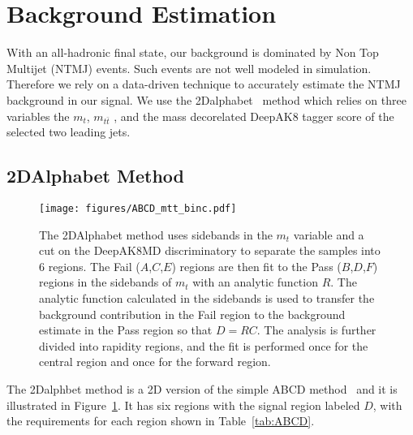 \section{Background Estimation}
\label{sec:bkg_est}

With an all-hadronic final state, our background is dominated by Non Top Multijet (NTMJ) events. Such events are not well modeled in simulation. Therefore we rely on a data-driven technique to accurately estimate the NTMJ background in our signal. We use the 2Dalphabet~\cite{2DAlphabet} method which relies on three variables the $m_{t}$, $m_{t\bar{t}}$ , and the mass decorelated DeepAK8 tagger score of the selected two leading jets.






\subsection{2DAlphabet Method}


\begin{figure}[h!]
	\begin{center}
		\texttt{[image: figures/ABCD\_mtt\_binc.pdf]}
		\caption{The 2DAlphabet method uses sidebands in the $m_{t}$ variable and a cut on the DeepAK8MD discriminatory to separate the samples into 6 regions. The Fail ($A$,$C$,$E$) regions are then fit to the Pass ($B$,$D$,$F$) regions in the sidebands of $m_{t}$ with an analytic function $R$. The analytic function calculated in the sidebands is used to transfer the background contribution in the Fail region to the background estimate in the Pass region so that $D = RC$. The analysis is further divided into rapidity regions, and the fit is performed once for the central region and once for the forward region.}
		\label{fig:ABCD}
	\end{center}
\end{figure}




The 2Dalphbet method is a 2D version of the simple ABCD method~\cite{ABCDmethod} and it is illustrated in Figure~\ref{fig:ABCD}. It has six regions with the signal region labeled $D$, with the requirements for each region shown in Table~\ref{tab:ABCD}.

